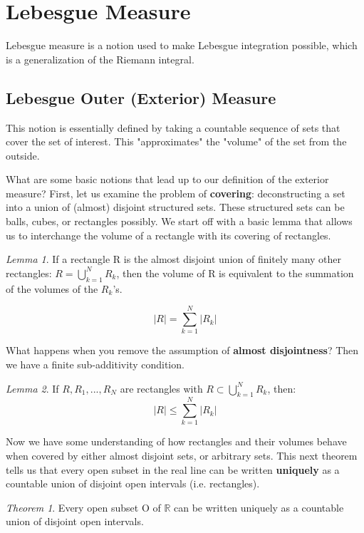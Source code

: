 \documentclass[class=article, crop=false]{standalone}
\theoremstyle{definition}
\theoremstyle{remark}
\theoremstyle{lemma}
\newtheorem*{lemma}{Lemma}
\theoremstyle{theorem}
\newtheorem*{theorem}{Theorem}
\theoremstyle{corollary}
\theoremstyle{property}
\begin{document}
\section{Lebesgue Measure}
	Lebesgue measure is a notion used to make Lebesgue integration possible, which is a generalization of the Riemann integral.

	\subsection{Lebesgue Outer (Exterior) Measure}
		This notion is essentially defined by taking a countable sequence of sets that cover the set of interest. This "approximates" the "volume" of the set from the outside.

		What are some basic notions that lead up to our definition of the exterior measure? First, let us examine the problem of \textbf{covering}: deconstructing a set into a union of (almost) disjoint structured sets. These structured sets can be balls, cubes, or rectangles possibly. We start off with a basic lemma that allows us to interchange the volume of a rectangle with its covering of rectangles.

		\begin{lemma}
			If a rectangle R is the almost disjoint union of finitely many other rectangles: $R = \bigcup_{k=1}^N R_k$, then the volume of R is equivalent to the summation of the volumes of the $R_k$'s.

				$$|R| = \sum_{k=1}^N |R_k|$$
		\end{lemma}

		What happens when you remove the assumption of \textbf{almost disjointness}? Then we have a finite sub-additivity condition.

		\begin{lemma}
			If $R, R_1, ..., R_N$ are rectangles with $R \subset \bigcup_{k=1}^N R_k$, then:
				$$|R| \le \sum_{k=1}^N |R_k|$$
		\end{lemma}

		Now we have some understanding of how rectangles and their volumes behave when covered by either almost disjoint sets, or arbitrary sets. This next theorem tells us that every open subset in the real line can be written \textbf{uniquely} as a countable union of disjoint open intervals (i.e. rectangles).

		\begin{theorem}
			Every open subset O of $\mathbb{R}$ can be written uniquely as a countable union of disjoint open intervals.
		\end{theorem}
\end{document}
